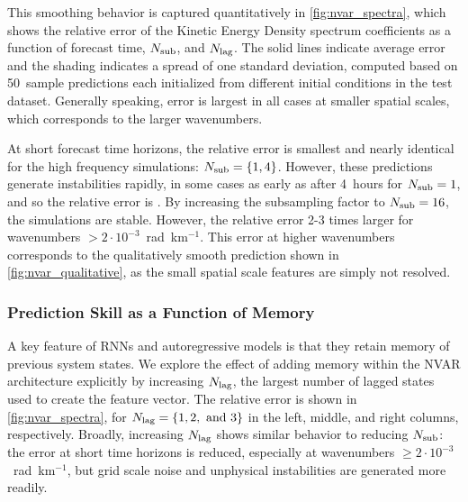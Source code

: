 This smoothing behavior is captured quantitatively in \cref{fig:nvar_spectra},
which shows the relative error of the Kinetic Energy Density spectrum
coefficients as a function of forecast time, $N_\text{sub}$, and $N_\text{lag}$.
The solid lines indicate average error and the shading indicates a spread of one
standard deviation, computed based on 50~sample predictions each initialized
from different initial conditions in the test dataset.
Generally speaking, error is largest in all cases at smaller spatial scales,
which corresponds to the larger wavenumbers.

At short forecast time horizons, the relative error is smallest and nearly
identical for the high frequency simulations: $N_\text{sub}=\{1,4\}$.
However, these predictions generate instabilities rapidly, in some cases as
early as after 4~hours for $N_\text{sub}=1$, and so the relative error is
.
By increasing the subsampling factor to $N_\text{sub}=16$, the simulations are stable.
However, the relative error 2-3 times larger for wavenumbers
$> 2\cdot10^{-3}$~rad~km$^{-1}$.
This error at higher wavenumbers corresponds to the qualitatively smooth
prediction shown in \cref{fig:nvar_qualitative}, as the small spatial scale
features are simply not resolved.


\subsubsection{Prediction Skill as a Function of Memory}

A key feature of RNNs and autoregressive models is that they retain memory of
previous system states.
We explore the effect of adding memory within the NVAR architecture explicitly
by increasing $N_\text{lag}$, the largest number of lagged states used to create the
feature vector.
The relative error is shown in \cref{fig:nvar_spectra}, for
$N_\text{lag}=\{1,2,\text{ and }3\}$ in
the left, middle, and right columns, respectively.
Broadly, increasing $N_\text{lag}$ shows similar behavior to reducing $N_\text{sub}$:
the error at short time horizons is reduced, especially at wavenumbers
$\ge 2\cdot10^{-3}$~rad~km$^{-1}$,
but grid scale noise and unphysical instabilities
are generated more readily.

